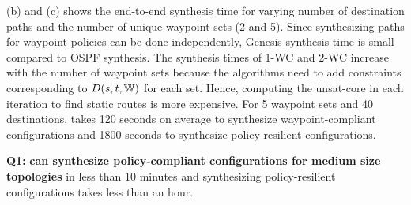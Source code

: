 (b) and (c) shows the end-to-end synthesis
 time for varying number of destination paths and the 
 number of unique waypoint sets (2 and 5). 
 Since synthesizing paths
 for waypoint policies can be done independently,
Genesis synthesis time is small compared to OSPF synthesis. 
The synthesis times of 1-WC and 2-WC 
increase with the number of waypoint sets because
the algorithms 
need to add constraints corresponding to $D(s,t,\mathbb{W})$ 
for each set. Hence, computing the unsat-core in each
iteration to find static routes is more expensive. 
For 5 waypoint sets and 40 destinations, \name takes 120 
seconds on average to synthesize waypoint-compliant configurations
and 1800 seconds to synthesize policy-resilient configurations.

\textbf{Q1:} \textbf{\name can synthesize policy-compliant configurations for medium size topologies} in less than 10 minutes and synthesizing policy-resilient 
configurations takes less than an hour.

